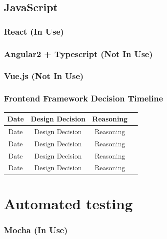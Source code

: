 \documentclass[12pt]{article}
\begin{document}
	\subsection{JavaScript}
	
	\subsubsection{React (In Use)}
	
	\subsubsection{Angular2 + Typescript (Not In Use)}
	
	\subsubsection{Vue.js (Not In Use)}
	
	\subsubsection{Frontend Framework Decision Timeline}
	

		\begin{center}
		\begin{tabular}{ |c|c|c|c| } 
		\hline
		Date & Design Decision & Reasoning \\
		\hline
		Date & Design Decision & Reasoning \\
		\hline
		Date & Design Decision & Reasoning \\
		\hline
		Date & Design Decision & Reasoning \\
		\hline
		Date & Design Decision & Reasoning \\
		\hline
		\end{tabular}
		\end{center}	


\newpage

\section{Automated testing}

\subsubsection{Mocha (In Use)}
\end{document}
